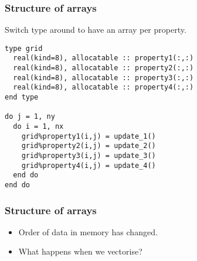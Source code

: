 \documentclass[aspectratio=169]{beamer}
\begin{document}
\begin{frame}[fragile]
\frametitle{Structure of arrays}
Switch type around to have an array per property.
\begin{verbatim}
type grid
  real(kind=8), allocatable :: property1(:,:)
  real(kind=8), allocatable :: property2(:,:)
  real(kind=8), allocatable :: property3(:,:)
  real(kind=8), allocatable :: property4(:,:)
end type

do j = 1, ny
  do i = 1, nx
    grid%property1(i,j) = update_1()
    grid%property2(i,j) = update_2()
    grid%property3(i,j) = update_3()
    grid%property4(i,j) = update_4()
  end do
end do
\end{verbatim}
\end{frame}

\begin{frame}
\frametitle{Structure of arrays}
\begin{itemize}
  \item Order of data in memory has changed.
  \item<2-> What happens when we vectorise?
\end{itemize}

\begin{adjustbox}{max width={\textwidth}}
\end{adjustbox}

\end{frame}
\end{document}

